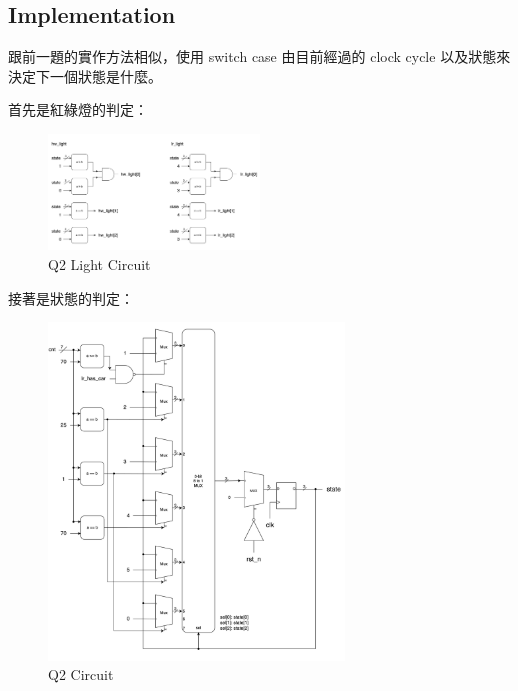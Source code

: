 \documentclass[10.5pt,compsoc,UTF8]{CjC}
\theoremstyle{mystyle}
\begin{document}
\subsection{Implementation}
跟前一題的實作方法相似，使用 switch case 由目前經過的 clock cycle 以及狀態來決定下一個狀態是什麼。
\par
首先是紅綠燈的判定：
\begin{figure}[h!]
  \centering
  \includegraphics[width=0.5\textwidth]{./img/Q2-hwlr.png}
  \caption{Q2 Light Circuit}
  \label{fig:Q2-light}
\end{figure}

\newpage

接著是狀態的判定：
\begin{figure}[h!]
  \centering
  \includegraphics[width=0.7\textwidth]{./img/Q2-state-circuit.png}
  \caption{Q2 Circuit}
  \label{fig:Q2-circuit}
\end{figure}

\newpage
\end{document}
